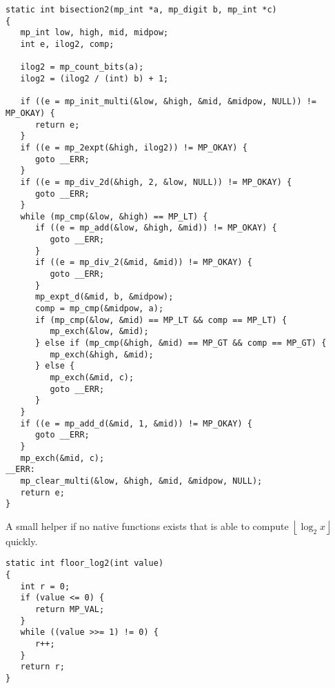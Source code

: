 \documentclass[a4paper,10pt]{report}
\providecommand{\floor}[1]{\left\lfloor#1\right\rfloor}
\theoremstyle{plain} %
\theoremstyle{definition}
\theoremstyle{remark}
\begin{document}
\begin{lstlisting}
static int bisection2(mp_int *a, mp_digit b, mp_int *c)
{
   mp_int low, high, mid, midpow;
   int e, ilog2, comp;

   ilog2 = mp_count_bits(a);
   ilog2 = (ilog2 / (int) b) + 1;

   if ((e = mp_init_multi(&low, &high, &mid, &midpow, NULL)) != MP_OKAY) {
      return e;
   }
   if ((e = mp_2expt(&high, ilog2)) != MP_OKAY) {
      goto __ERR;
   }
   if ((e = mp_div_2d(&high, 2, &low, NULL)) != MP_OKAY) {
      goto __ERR;
   }
   while (mp_cmp(&low, &high) == MP_LT) {
      if ((e = mp_add(&low, &high, &mid)) != MP_OKAY) {
         goto __ERR;
      }
      if ((e = mp_div_2(&mid, &mid)) != MP_OKAY) {
         goto __ERR;
      }
      mp_expt_d(&mid, b, &midpow);
      comp = mp_cmp(&midpow, a);
      if (mp_cmp(&low, &mid) == MP_LT && comp == MP_LT) {
         mp_exch(&low, &mid);
      } else if (mp_cmp(&high, &mid) == MP_GT && comp == MP_GT) {
         mp_exch(&high, &mid);
      } else {
         mp_exch(&mid, c);
         goto __ERR;
      }
   }
   if ((e = mp_add_d(&mid, 1, &mid)) != MP_OKAY) {
      goto __ERR;
   }
   mp_exch(&mid, c);
__ERR:
   mp_clear_multi(&low, &high, &mid, &midpow, NULL);
   return e;
}
\end{lstlisting}
A small helper if no native functions exists that is able to compute $\floor{\log_2 x}$ quickly.
\begin{lstlisting}
static int floor_log2(int value)
{
   int r = 0;
   if (value <= 0) {
      return MP_VAL;
   }
   while ((value >>= 1) != 0) {
      r++;
   }
   return r;
}
\end{lstlisting}


\printbibliography
\end{document}
